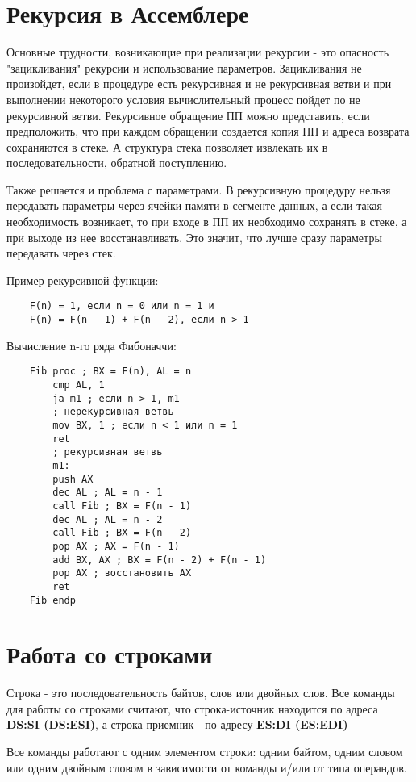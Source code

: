 \section{Рекурсия в Ассемблере}

Основные трудности, возникающие при реализации рекурсии - это опасность "зацикливания" рекурсии и использование параметров. Зацикливания не произойдет,
если в процедуре есть рекурсивная и не рекурсивная ветви и при выполнении некоторого условия вычислительный процесс пойдет по не рекурсивной ветви. Рекурсивное обращение ПП можно представить, если предположить,
что при каждом обращении создается копия ПП и адреса возврата сохраняются в стеке. А структура стека позволяет извлекать их в последовательности, обратной поступлению.

Также решается и проблема с параметрами. В рекурсивную процедуру нельзя передавать параметры через ячейки памяти в сегменте данных, а если такая необходимость возникает, то при входе в ПП их необходимо сохранять в стеке, а при выходе из нее восстанавливать.
Это значит, что лучше сразу параметры передавать через стек.

Пример рекурсивной функции:
\begin{verbatim}
    F(n) = 1, если n = 0 или n = 1 и
    F(n) = F(n - 1) + F(n - 2), если n > 1
\end{verbatim}

Вычисление n-го ряда Фибоначчи:
\begin{verbatim}
    Fib proc ; BX = F(n), AL = n
        cmp AL, 1
        ja m1 ; если n > 1, m1
        ; нерекурсивная ветвь
        mov BX, 1 ; если n < 1 или n = 1
        ret
        ; рекурсивная ветвь
        m1:
        push AX
        dec AL ; AL = n - 1
        call Fib ; BX = F(n - 1)
        dec AL ; AL = n - 2
        call Fib ; BX = F(n - 2)
        pop AX ; AX = F(n - 1)
        add BX, AX ; BX = F(n - 2) + F(n - 1)
        pop AX ; восстановить AX
        ret
    Fib endp
\end{verbatim}


\section{Работа со строками}

Строка - это последовательность  байтов, слов или двойных слов. Все команды для работы со строками считают, что строка-источник находится по адреса \textbf{DS:SI (DS:ESI)}, а строка приемник - по адресу \textbf{ES:DI (ES:EDI)}

Все команды работают с одним элементом строки: одним байтом, одним словом или одним двойным словом в зависимости от команды и/или от типа операндов.

